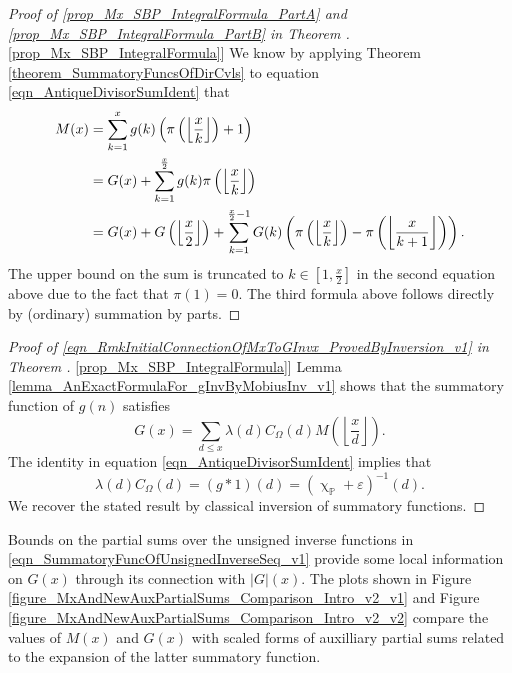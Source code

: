 \documentclass[11pt,reqno,a4letter]{article}
\newcommand{\hlocalref}[1]{\hyperref[#1]{\ref{#1}}}
\numberwithin{equation}{section}
\numberwithin{figure}{section}
\numberwithin{table}{section}
\renewcommand{\chi}{\upchi}
\newcommand{\Floor}[2]{\ensuremath{\left\lfloor \frac{#1}{#2} \right\rfloor}}
\theoremstyle{plain}
\numberwithin{theorem}{section}
\theoremstyle{definition}
\begin{document}
\begin{proof}[Proof of 
              \eqref{prop_Mx_SBP_IntegralFormula_PartA} and \eqref{prop_Mx_SBP_IntegralFormula_PartB} in 
              Theorem \hlocalref{prop_Mx_SBP_IntegralFormula}] 
We know by applying Theorem \hlocalref{theorem_SummatoryFuncsOfDirCvls} to 
equation \eqref{eqn_AntiqueDivisorSumIdent} that 
\begin{align} 
\notag
M(x) & = \sum_{k=1}^{x} g(k) \left(\pi\left(\Floor{x}{k}\right)+1\right) \\ 
\notag 
     & = G(x) + \sum_{k=1}^{\frac{x}{2}} g(k) \pi\left(\Floor{x}{k}\right) \\ 
\notag 
     & = G(x) + G\left(\Floor{x}{2}\right) + 
     \sum_{k=1}^{\frac{x}{2}-1} G(k) \left( 
     \pi\left(\Floor{x}{k}\right) - \pi\left(\Floor{x}{k+1}\right) 
     \right).
\end{align} 
The upper bound on the sum is truncated to $k \in \left[1, \frac{x}{2}\right]$ in the second equation 
above due to the fact that $\pi(1) = 0$. 
The third formula above follows directly by (ordinary) summation by parts. 
\end{proof} 
\begin{proof}[Proof of \eqref{eqn_RmkInitialConnectionOfMxToGInvx_ProvedByInversion_v1} in Theorem \hlocalref{prop_Mx_SBP_IntegralFormula}]
Lemma \hlocalref{lemma_AnExactFormulaFor_gInvByMobiusInv_v1} 
shows that the summatory 
function of $g(n)$ satisfies 
\[
G(x) = \sum_{d \leq x} \lambda(d) C_{\Omega}(d) M\left(\Floor{x}{d}\right). 
\]
The identity in equation \eqref{eqn_AntiqueDivisorSumIdent} implies that 
$$\lambda(d) C_{\Omega}(d) = (g \ast 1)(d) = (\chi_{\mathbb{P}} + \varepsilon)^{-1}(d).$$ 
We recover the stated result by classical inversion of summatory functions. 
\end{proof}

Bounds on the partial sums over the unsigned inverse functions in 
\eqref{eqn_SummatoryFuncOfUnsignedInverseSeq_v1} 
provide some local information on $G(x)$ through its connection with $|G|(x)$. 
The plots shown in 
Figure \hlocalref{figure_MxAndNewAuxPartialSums_Comparison_Intro_v2_v1} and 
Figure \hlocalref{figure_MxAndNewAuxPartialSums_Comparison_Intro_v2_v2} compare 
the values of $M(x)$ and $G(x)$ with scaled forms of auxilliary partial sums 
related to the expansion of the latter summatory function. 
\end{document}
